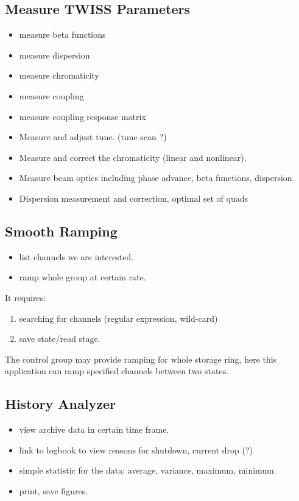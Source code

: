 \documentclass[11pt,oneside,letterpaper,showtrims,article]{memoir}
\begin{document}
\subsection{Measure TWISS Parameters}

\begin{itemize}%
\item measure beta functions
\item measure dispersion
\item measure chromaticity
\item measure coupling
\item measure coupling response matrix
\item Measure and adjust tune. (tune scan ?)
\item Measure and correct the chromaticity (linear and nonlinear). 
\item Measure beam optics including phase advance, beta functions, dispersion.
\item Dispersion measurement and correction, optimal set of quads
\end{itemize}

\subsection{Smooth Ramping}

\begin{itemize}%
\item list channels we are interested.
\item ramp whole group at certain rate.
\end{itemize}
It requires:
\begin{enumerate}
\item searching for channels (regular expression, wild-card)
\item save state/read stage.
\end{enumerate}
The control group may provide ramping for whole storage ring, here this
application can ramp specified channels between two states.

\subsection{History Analyzer}

\begin{itemize}%
\item view archive data in certain time frame.
\item link to logbook to view reasons for shutdown, current drop (?)
\item simple statistic for the data: average, variance, maximum, minimum.
\item print, save figures.
\end{itemize}
\end{document}
